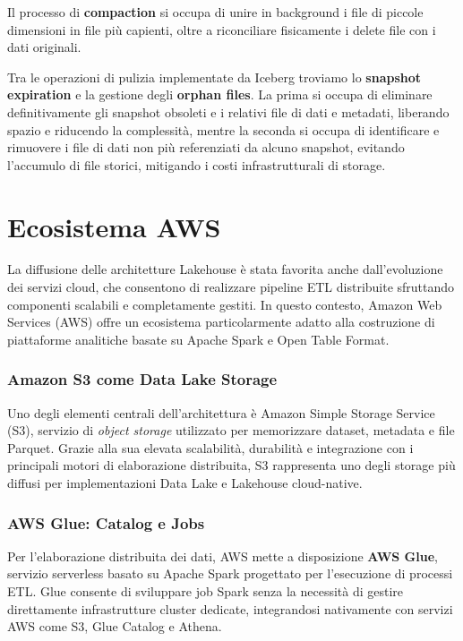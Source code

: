 \documentclass[12pt,a4paper,openright,twoside]{book}
\begin{document}
Il processo di \textbf{compaction} si occupa di unire in background i file di piccole dimensioni in file più capienti, oltre a riconciliare fisicamente i delete file con i dati originali. 

Tra le operazioni di pulizia implementate da Iceberg troviamo lo \textbf{snapshot expiration} e la gestione degli \textbf{orphan files}. La prima si occupa di eliminare definitivamente gli snapshot obsoleti e i relativi file di dati e metadati, liberando spazio e riducendo la complessità, 
mentre la seconda si occupa di identificare e rimuovere i file di dati non più referenziati da alcuno snapshot, evitando l'accumulo di file storici, mitigando i costi infrastrutturali di storage.

\section{Ecosistema AWS}

La diffusione delle architetture Lakehouse è stata favorita anche dall’evoluzione dei servizi cloud, che consentono di realizzare pipeline ETL distribuite sfruttando componenti scalabili e completamente gestiti. 
In questo contesto, Amazon Web Services (AWS) offre un ecosistema particolarmente adatto alla costruzione di piattaforme analitiche basate su Apache Spark e Open Table Format. \cite{AWSGlueDocs}

\subsubsection{Amazon S3 come Data Lake Storage}

Uno degli elementi centrali dell’architettura è Amazon Simple Storage Service (S3), servizio di \textit{object storage} utilizzato per memorizzare dataset, metadata e file Parquet. 
Grazie alla sua elevata scalabilità, durabilità e integrazione con i principali motori di elaborazione distribuita, S3 rappresenta uno degli storage più diffusi per implementazioni Data Lake e Lakehouse cloud-native.

\subsubsection{AWS Glue: Catalog e Jobs}
Per l’elaborazione distribuita dei dati, AWS mette a disposizione \textbf{AWS Glue}, servizio serverless basato su Apache Spark progettato per l’esecuzione di processi ETL. 
Glue consente di sviluppare job Spark senza la necessità di gestire direttamente infrastrutture cluster dedicate, integrandosi nativamente con servizi AWS come S3, Glue Catalog e Athena.
\end{document}
